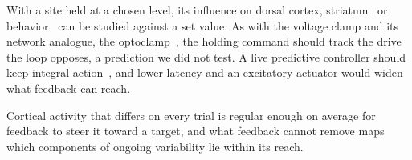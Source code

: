 With a site held at a chosen level, its influence on dorsal cortex, striatum~\citep{Peters2021} or behavior~\citep{ZatkaHaas2021} can be studied against a set value. As with the voltage clamp and its network analogue, the optoclamp~\citep{newman2015optogenetic}, the holding command should track the drive the loop opposes, a prediction we did not test. A live predictive controller should keep integral action~\citep{pannocchia2003disturbance}, and lower latency and an excitatory actuator would widen what feedback can reach.

Cortical activity that differs on every trial is regular enough on average for feedback to steer it toward a target, and what feedback cannot remove maps which components of ongoing variability lie within its reach.
